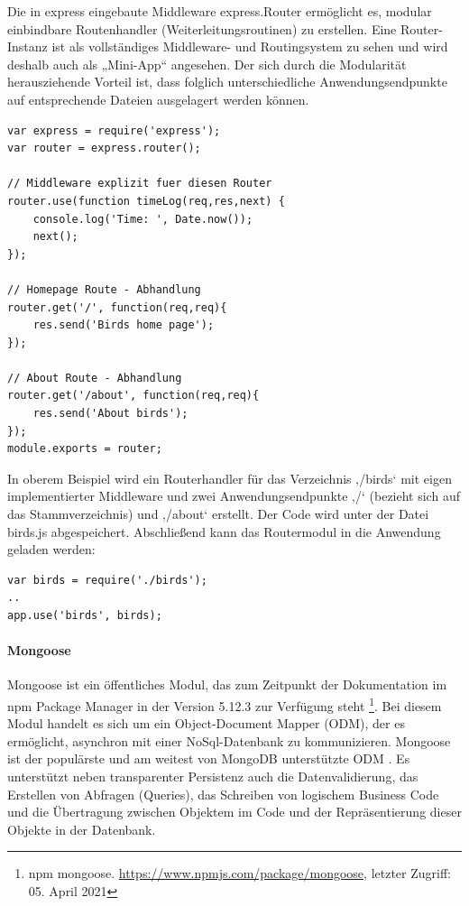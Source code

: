\noindent
Die in express eingebaute Middleware express.Router ermöglicht es, modular einbindbare Routenhandler (Weiterleitungsroutinen) zu erstellen. Eine Router-Instanz ist als vollständiges Middleware- und Routingsystem zu sehen und wird deshalb auch als „Mini-App“ angesehen. Der sich durch die Modularität herausziehende Vorteil ist, dass folglich unterschiedliche Anwendungsendpunkte auf entsprechende Dateien ausgelagert werden können.
\newline

\begin{lstlisting}[caption=Routinghandler erstellen \protect \footnotemark,label=lst:RoutingHandlerCreate]
var express = require('express');
var router = express.router();

// Middleware explizit fuer diesen Router
router.use(function timeLog(req,res,next) {
	console.log('Time: ', Date.now());
	next();
});

// Homepage Route - Abhandlung
router.get('/', function(req,req){
	res.send('Birds home page');
});

// About Route - Abhandlung
router.get('/about', function(req,req){
	res.send('About birds');
});
module.exports = router;
\end{lstlisting}

\noindent
In oberem Beispiel wird ein Routerhandler für das Verzeichnis ‚/birds‘ mit eigen implementierter Middleware und zwei Anwendungsendpunkte ‚/‘ (bezieht sich auf das Stammverzeichnis) und ‚/about‘ erstellt. Der Code wird unter der Datei birds.js abgespeichert. 
Abschließend kann das Routermodul in die Anwendung geladen werden: 
\newline

\begin{lstlisting}[caption=Routinghandler benutzen,label=lst:RoutingHandlerUsage]
var birds = require('./birds');
..
app.use('birds', birds);
\end{lstlisting}

%
%
%

\newpage
\paragraph{Mongoose}
Mongoose ist ein öffentliches Modul, das zum Zeitpunkt der Dokumentation im npm Package Manager in der Version 5.12.3 zur Verfügung steht \footnote{npm mongoose. \url{https://www.npmjs.com/package/mongoose}, letzter Zugriff: 05. April 2021}. Bei diesem Modul handelt es sich um ein Object-Document Mapper (ODM), der es ermöglicht, asynchron mit einer NoSql-Datenbank zu kommunizieren. Mongoose ist der populärste und am weitest von MongoDB unterstützte ODM \cite{Node2.55}. Es unterstützt neben transparenter Persistenz auch die Datenvalidierung, das Erstellen von Abfragen (Queries), das Schreiben von logischem Business Code und die Übertragung zwischen Objektem im Code und der Repräsentierung dieser Objekte in der Datenbank.
\newline

